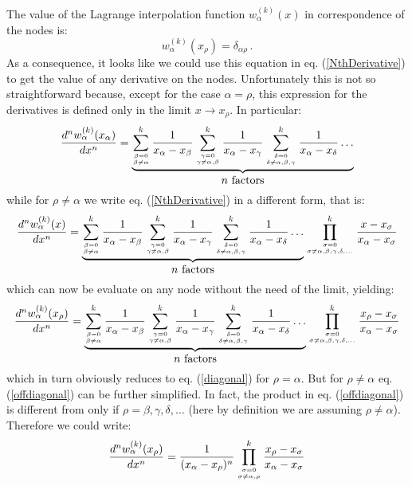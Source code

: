 \documentclass[10pt,a4paper]{article}
\begin{document}
The value of the Lagrange interpolation function $w_\alpha^{(k)}(x)$
in correspondence of the nodes is:
\begin{equation}
w_\alpha^{(k)}(x_\rho) = \delta_{\alpha\rho}\,.
\end{equation}
As a consequence, it looks like we could use this equation in
eq. (\ref{NthDerivative}) to get the value of any derivative on the
nodes. Unfortunately this is not so straightforward because, except
for the case $\alpha=\rho$, this expression for the derivatives is
defined only in the limit $x\rightarrow x_\rho$. In particular:
\begin{equation}\label{diagonal}
\frac{d^n w_\alpha^{(k)}(x_\alpha)}{dx^n}
=\underbrace{\sum_{\beta=0\atop \beta\neq\alpha}^k\frac{1}{x_\alpha-x_\beta}
\sum_{\gamma=0\atop \gamma\neq\alpha,\beta}^k\frac{1}{x_\alpha-x_\gamma}
\sum_{\delta=0\atop \delta\neq\alpha,\beta,\gamma}^k\frac{1}{x_\alpha-x_\delta}
\dots}_{\mbox{$n$ factors}}
\end{equation}
while for $\rho\neq\alpha$ we write eq. (\ref{NthDerivative}) in a
different form, that is:
\begin{equation}
\frac{d^n w_\alpha^{(k)}(x)}{dx^n}
=\underbrace{\sum_{\beta=0\atop \beta\neq\alpha}^k\frac{1}{x_\alpha-x_\beta}
\sum_{\gamma=0\atop \gamma\neq\alpha,\beta}^k\frac{1}{x_\alpha-x_\gamma}
\sum_{\delta=0\atop \delta\neq\alpha,\beta,\gamma}^k\frac{1}{x_\alpha-x_\delta}
\dots}_{\mbox{$n$ factors}}
\prod_{\sigma=0\atop\sigma\neq\alpha,\beta,\gamma,\delta,\dots}^k\frac{x - x_\sigma}{x_\alpha-x_\sigma} 
\end{equation}
which can now be evaluate on any node without the need of the limit, yielding:
\begin{equation}\label{offdiagonal}
\frac{d^n w_\alpha^{(k)}(x_\rho)}{dx^n}
=\underbrace{\sum_{\beta=0\atop \beta\neq\alpha}^k\frac{1}{x_\alpha-x_\beta}
\sum_{\gamma=0\atop \gamma\neq\alpha,\beta}^k\frac{1}{x_\alpha-x_\gamma}
\sum_{\delta=0\atop \delta\neq\alpha,\beta,\gamma}^k\frac{1}{x_\alpha-x_\delta}
\dots}_{\mbox{$n$ factors}}
\prod_{\sigma=0\atop\sigma\neq\alpha,\beta,\gamma,\delta,\dots}^k\frac{x_\rho - x_\sigma}{x_\alpha-x_\sigma} 
\end{equation}
which in turn obviously reduces to eq. (\ref{diagonal}) for
$\rho=\alpha$. But for $\rho\neq\alpha$ eq. (\ref{offdiagonal}) can be
further simplified. In fact, the product in eq. (\ref{offdiagonal}) is
different from only if
$\rho = \beta,\gamma,\delta,\dots$ (here by definition we are assuming $\rho \neq \alpha$). Therefore we could write:
\begin{equation}\label{offdiagonal2}
\frac{d^n w_\alpha^{(k)}(x_\rho)}{dx^n}
=\frac{1}{(x_\alpha-x_\rho)^n}
\prod_{\sigma=0\atop\sigma\neq\alpha,\rho}^k\frac{x_\rho - x_\sigma}{x_\alpha-x_\sigma} 
\end{equation}
\end{document}
